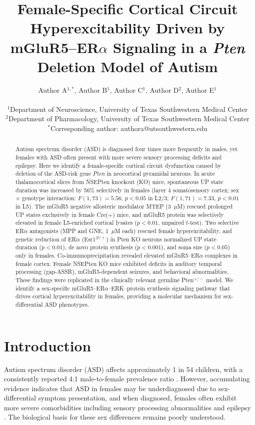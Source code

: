 \documentclass[11pt]{article}
\title{Female-Specific Cortical Circuit Hyperexcitability Driven by mGluR5--ER$\alpha$ Signaling in a \textit{Pten} Deletion Model of Autism}
\author{
Author A$^{1,*}$, Author B$^{1}$, Author C$^{1}$, Author D$^{2}$, Author E$^{1}$ \\
\\
$^{1}$Department of Neuroscience, University of Texas Southwestern Medical Center \\
$^{2}$Department of Pharmacology, University of Texas Southwestern Medical Center \\
$^{*}$Corresponding author: authora@utsouthwestern.edu
}
\date{}
\begin{document}
\maketitle

\begin{abstract}
Autism spectrum disorder (ASD) is diagnosed four times more frequently in males, yet females with ASD often present with more severe sensory processing deficits and epilepsy. Here we identify a female-specific cortical circuit dysfunction caused by deletion of the ASD-risk gene \textit{Pten} in neocortical pyramidal neurons. In acute thalamocortical slices from NSEPten knockout (KO) mice, spontaneous UP state duration was increased by 56\% selectively in females (layer 4 somatosensory cortex; sex $\times$ genotype interaction: $F(1,73) = 5.56$, $p < 0.05$ in L2/3; $F(1,71) = 7.33$, $p < 0.01$ in L5). The mGluR5 negative allosteric modulator MTEP (3~$\mu$M) rescued prolonged UP states exclusively in female Cre(+) mice, and mGluR5 protein was selectively elevated in female L5-enriched cortical lysates ($p < 0.01$, unpaired $t$-test). Two selective ER$\alpha$ antagonists (MPP and GNE, 1~$\mu$M each) rescued female hyperexcitability, and genetic reduction of ER$\alpha$ (Esr1$^{fl/+}$) in Pten KO neurons normalized UP state duration ($p < 0.01$), de novo protein synthesis ($p < 0.001$), and soma size ($p < 0.05$) only in females. Co-immunoprecipitation revealed elevated mGluR5--ER$\alpha$ complexes in female cortex. Female NSEPten KO mice exhibited deficits in auditory temporal processing (gap-ASSR), mGluR5-dependent seizures, and behavioral abnormalities. These findings were replicated in the clinically relevant germline Pten$^{+/-}$ model. We identify a sex-specific mGluR5--ER$\alpha$--ERK--protein synthesis signaling pathway that drives cortical hyperexcitability in females, providing a molecular mechanism for sex-differential ASD phenotypes.
\end{abstract}

\section{Introduction}

Autism spectrum disorder (ASD) affects approximately 1 in 54 children, with a consistently reported 4:1 male-to-female prevalence ratio \citep{autism2018prevalence}. However, accumulating evidence indicates that ASD in females may be underdiagnosed due to sex-differential symptom presentation, and when diagnosed, females often exhibit more severe comorbidities including sensory processing abnormalities and epilepsy \citep{werling2013sex}. The biological basis for these sex differences remains poorly understood.
\end{document}
